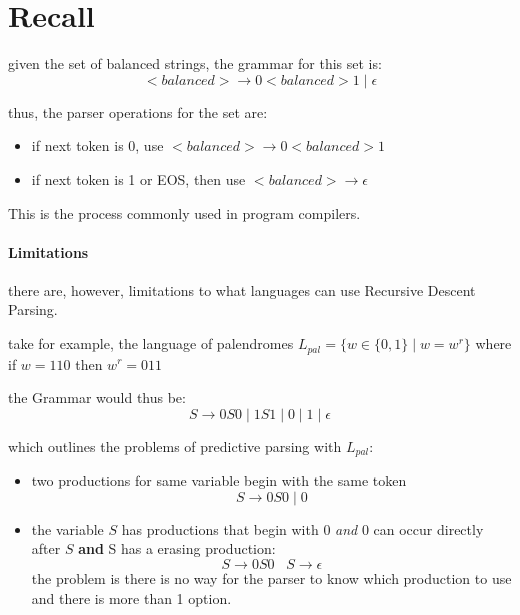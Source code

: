 \documentclass[12pt]{book}
\title{\coursetitle\linebreak\lecturename}
\author{\\Cain Susko\\ 
           \\ \\ \\
      Queen's University 
    \\School of Computing\\}
\begin{document}
\begin{titlepage}
        \maketitle
\end{titlepage}


\section*{Recall}
given the set of balanced strings, the grammar for this set is:
\[<balanced> \to 0<balanced>1 \mid \epsilon\]

thus, the parser operations for the set are:
\begin{itemize}
        \item if next token is 0, use $<balanced> \to 0<balanced>1$
        \item if next token is 1 or EOS, then use 
                $<balanced> \to \epsilon$
\end{itemize}

This is the process commonly used in program compilers.

\paragraph{Limitations}
there are, however, limitations to what languages can use Recursive 
Descent Parsing. 

take for example, the language of palendromes 
$L_{pal} = \{w\in\{0,1\}\mid w = w^r\}$ where if $w = 110$ then
$w^r = 011$

the Grammar would thus be:
\[S \to 0S0 \mid 1S1 \mid 0 \mid 1 \mid \epsilon\]

which outlines the problems of predictive parsing with $L_{pal}$:
\begin{itemize}
        \item two productions for same variable begin with the same token
                \[S \to 0S0 \mid 0\]
        \item the variable $S$ has productions that begin with 0 \textit{
                and} 0 can occur directly after $S$ \textbf{and} S has
                a erasing production:
                \[S \to 0S0 \;\;\; S \to \epsilon\]
                the problem is there is no way for the parser to know
                which production to use and there is more than 1 option.
\end{itemize}
\end{document}
